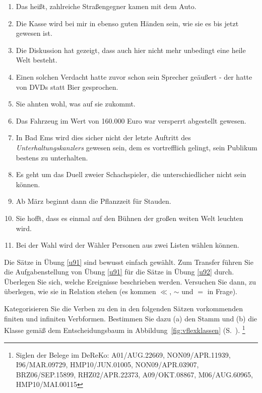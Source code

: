 \begin{sloppypar}
\begin{enumerate}\Lf
  \item Das heißt, zahlreiche Straßengegner kamen mit dem Auto.
  \item Die Kasse wird bei mir in ebenso guten Händen sein, wie sie es bis jetzt gewesen ist.
  \item Die Diskussion hat gezeigt, dass auch hier nicht mehr unbedingt eine heile Welt besteht.
  \item Einen solchen Verdacht hatte zuvor schon sein Sprecher geäußert - der hatte von DVDs statt Bier gesprochen.
  \item Sie ahnten wohl, was auf sie zukommt.
  \item Das Fahrzeug im Wert von 160.000 Euro war versperrt abgestellt gewesen.
  \item In Bad Ems wird dies sicher nicht der letzte Auftritt des \textit{Unterhaltungskanzlers} gewesen sein, dem es vortrefflich gelingt, sein Publikum bestens zu unterhalten.
  \item Es geht um das Duell zweier Schachspieler, die unterschiedlicher nicht sein können.
  \item Ab März beginnt dann die Pflanzzeit für Stauden.
  \item Sie hofft, dass es einmal auf den Bühnen der großen weiten Welt leuchten wird.
  \item Bei der Wahl wird der Wähler Personen aus zwei Listen wählen können.
\end{enumerate}

\Uebung[\tristar] \label{u93} Die Sätze in Übung \ref{u91} sind bewusst einfach gewählt.
Zum Transfer führen Sie die Aufgabenstellung von Übung \ref{u91} für die Sätze in Übung \ref{u92} durch.
Überlegen Sie sich, welche Ereignisse beschrieben werden.
Versuchen Sie dann, zu überlegen, wie sie in Relation stehen (es kommen $\ll$, $\sim$ und $=$ in Frage).

\Uebung \label{u94} Kategorisieren Sie die Verben zu den in den folgenden Sätzen vorkommenden finiten und infiniten Verbformen.
Bestimmen Sie dazu (a) den Stamm und (b) die Klasse gemäß dem Entscheidungsbaum in Abbildung~\ref{fig:vflexklassen} (S.~\pageref{fig:vflexklassen}).%
\footnote{Siglen der Belege im DeReKo: A01\slash AUG.22669, NON09\slash APR.11939, I96\slash MAR.09729, HMP10\slash JUN.01005, NON09\slash APR.03907, BRZ06\slash SEP.15899, RHZ02\slash APR.22373, A09\slash OKT.08867, M06\slash AUG.60965, HMP10\slash MAI.00115}


\end{sloppypar}
